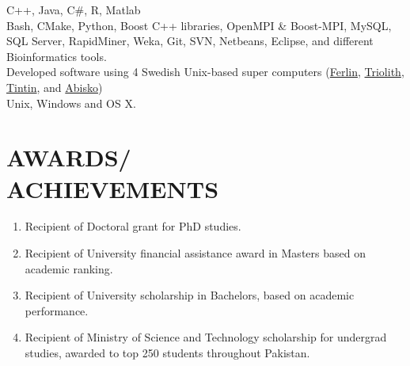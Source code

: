 \documentclass[margin, 10pt]{res} %
\begin{document}
\begin{resume}
{\bf \color{Brown}{Languages:}} 
C++, Java, C\#, R, Matlab \\
{\bf \color{Brown}{Misc Tools:}} Bash, CMake, Python, Boost C++ libraries, OpenMPI \& Boost-MPI, MySQL, SQL Server, RapidMiner, Weka, Git, SVN, Netbeans, Eclipse, and different Bioinformatics tools. \\
{\bf \color{Brown}{HPC Clusters:}} Developed software using 4 Swedish Unix-based super computers (\href{https://www.pdc.kth.se/resources/computers/ferlin}{Ferlin}, \href{https://www.nsc.liu.se/systems/triolith/}{Triolith}, \href{http://www.uppmax.uu.se/}{Tintin}, and \href{http://www.hpc2n.umu.se/resources/abisko}{Abisko}) \\
{\bf \color{Brown}{Operating Systems:}} Unix, Windows and OS X.


\section{AWARDS/ \\ ACHIEVEMENTS} 

\begin{enumerate}
\item Recipient of Doctoral grant for PhD studies.
\item Recipient of University financial assistance award in Masters based on academic ranking.
\item Recipient of University scholarship in Bachelors, based on academic performance.
\item Recipient of Ministry of Science and Technology scholarship for undergrad studies, awarded to top 250 students throughout Pakistan.
\end{enumerate} 



\end{resume}
\end{document}
